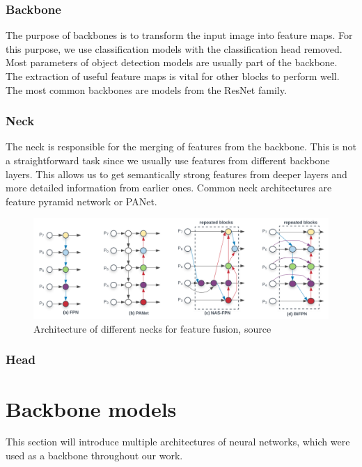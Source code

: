 \subsubsection{Backbone}
The purpose of backbones is to transform the input image into feature maps. For this purpose, we use classification models with the classification head removed. Most parameters of object detection models are usually part of the backbone. The extraction of useful feature maps is vital for other blocks to perform well. The most common backbones are models from the ResNet family.

\subsubsection{Neck}
The neck is responsible for the merging of features from the backbone. This is not a straightforward task since we usually use features from different backbone layers. This allows us to get semantically strong features from deeper layers and more detailed information from earlier ones. Common neck architectures are feature pyramid network or PANet.
\begin{figure}
    \centering
    \includegraphics[width=\linewidth]{images/necks_architecture.png}
    \caption{Architecture of different necks for feature fusion, source \cite{Tan2019}}
    \label{fig:necks}
\end{figure}

\subsubsection{Head}

\section{Backbone models}
This section will introduce multiple architectures of neural networks, which were used as a backbone throughout our work.
